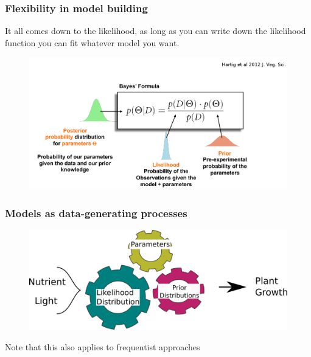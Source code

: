 \documentclass{beamer}
\begin{document}
  \begin{frame}
  \frametitle{\bf Flexibility in model building}
  
  It all comes down to the likelihood, as long as you can write down the likelihood function you can fit whatever model you want.
  
  \begin{figure}
   \includegraphics[width=.7\textwidth,height=.6\textheight,keepaspectratio]{summ.png}
  \end{figure}

  
 \end{frame}
 
 \begin{frame}
  \frametitle{\bf Models as data-generating processes}
  
  \begin{figure}
   \includegraphics[width=\textwidth,height=.7\textheight,keepaspectratio]{cogs_f.png}
  \end{figure}

  Note that this also applies to frequentist approaches
  
 \end{frame}
\end{document}
